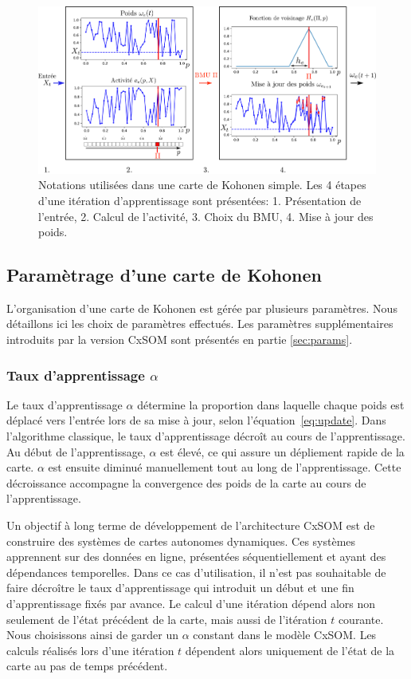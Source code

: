 \documentclass[../main]{subfiles}
\begin{document}
\begin{figure}
\centering
\includegraphics[width=\textwidth]{one_map_one_layer2.pdf}
\caption{Notations utilisées dans une carte de Kohonen simple. Les 4 étapes d'une itération d'apprentissage sont présentées: 1. Présentation de l'entrée, 2. Calcul de l'activité, 3. Choix du BMU, 4. Mise à jour des poids.}
\label{fig:one_map_not}
\end{figure}

\subsection{Paramètrage d'une carte de Kohonen}\label{sec:parametres_carte}

L'organisation d'une carte de Kohonen est gérée par plusieurs paramètres. 
Nous détaillons ici les choix de paramètres effectués. 
Les paramètres supplémentaires introduits par la version CxSOM sont présentés en partie \ref{sec:params}.

\subsubsection{Taux d'apprentissage $\alpha$}

Le taux d'apprentissage $\alpha$ détermine la proportion dans laquelle chaque poids est déplacé vers l'entrée lors de sa mise à jour, selon l'équation~\ref{eq:update}. 
Dans l'algorithme classique, le taux d'apprentissage décroît au cours de l'apprentissage. Au début de l'apprentissage, $\alpha$ est élevé, ce qui assure un dépliement rapide de la carte. $\alpha$ est ensuite diminué manuellement tout au long de l'apprentissage. Cette décroissance accompagne la convergence des poids de la carte au cours de l'apprentissage.

Un objectif à long terme de développement de l'architecture CxSOM est de construire des systèmes de cartes autonomes dynamiques. Ces systèmes apprennent sur des données en ligne, présentées séquentiellement et ayant des dépendances temporelles. Dans ce cas d'utilisation, il n'est pas souhaitable de faire décroître le taux d'apprentissage qui introduit un début et une fin d'apprentissage fixés par avance. Le calcul d'une itération dépend alors non seulement de l'état précédent de la carte, mais aussi de l'itération $t$ courante. 
Nous choisissons ainsi de garder un $\alpha$ constant dans le modèle CxSOM.
Les calculs réalisés lors d'une itération $t$ dépendent alors uniquement de l'état de la carte au pas de temps précédent.
\end{document}
